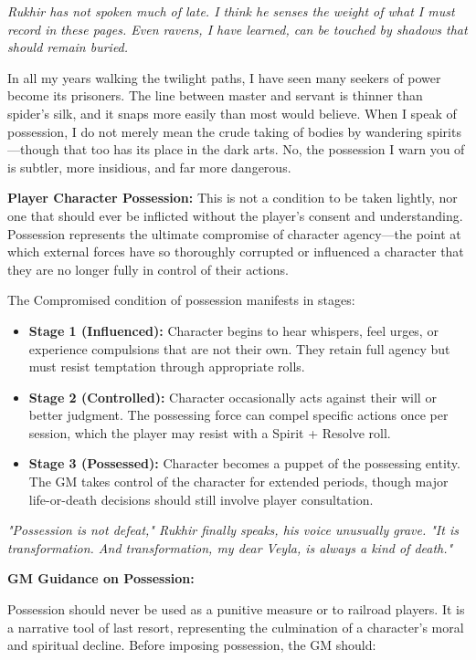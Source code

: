 \documentclass[12pt,twoside]{book}
\newcommand{\shadow}[1]{\textit{#1}}
\begin{document}
\shadow{Rukhir has not spoken much of late. I think he senses the weight of what I must record in these pages. Even ravens, I have learned, can be touched by shadows that should remain buried.}

In all my years walking the twilight paths, I have seen many seekers of power become its prisoners. The line between master and servant is thinner than spider's silk, and it snaps more easily than most would believe. When I speak of possession, I do not merely mean the crude taking of bodies by wandering spirits—though that too has its place in the dark arts. No, the possession I warn you of is subtler, more insidious, and far more dangerous.

\textbf{Player Character Possession:} This is not a condition to be taken lightly, nor one that should ever be inflicted without the player's consent and understanding. Possession represents the ultimate compromise of character agency—the point at which external forces have so thoroughly corrupted or influenced a character that they are no longer fully in control of their actions.

The Compromised condition of possession manifests in stages:

\begin{itemize}
\item \textbf{Stage 1 (Influenced):} Character begins to hear whispers, feel urges, or experience compulsions that are not their own. They retain full agency but must resist temptation through appropriate rolls.
\item \textbf{Stage 2 (Controlled):} Character occasionally acts against their will or better judgment. The possessing force can compel specific actions once per session, which the player may resist with a Spirit + Resolve roll.
\item \textbf{Stage 3 (Possessed):} Character becomes a puppet of the possessing entity. The GM takes control of the character for extended periods, though major life-or-death decisions should still involve player consultation.
\end{itemize}

\shadow{"Possession is not defeat," Rukhir finally speaks, his voice unusually grave. "It is transformation. And transformation, my dear Veyla, is always a kind of death."}

\textbf{GM Guidance on Possession:}

Possession should never be used as a punitive measure or to railroad players. It is a narrative tool of last resort, representing the culmination of a character's moral and spiritual decline. Before imposing possession, the GM should:
\end{document}
